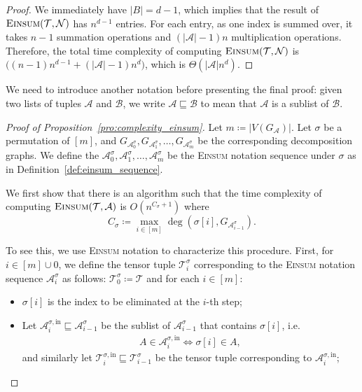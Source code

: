 \documentclass[12pt]{article}
\theoremstyle{plain}
\theoremstyle{definition}
\def\Einsum{\textsc{Einsum}}
\newcommand{\tensorcontraction}{\textsc{Einsum}}
\newcommand{\degp}[2]{\deg(#1,#2)}
\newcommand{\verticesp}[1]{V(#1)}
\newcommand{\graphform}[1]{G_{#1}}
\newcommand{\less}{O}
\newcommand{\appequal}{\Theta}
\def\calA{\mathcal{A}}
\def\calB{\mathcal{B}}
\def\calT{\mathcal{T}}
\def\calN{\mathcal{N}}
\begin{document}
\begin{bibunit}[agsm]
\begin{proof}
We immediately have $|B| = d - 1$, which implies that the result of $\tensorcontraction(\calT, \calN)$ has $n^{d-1}$ entries. For each entry, as one index is summed over, it takes $n-1$ summation operations and $(|\calA|-1)n$ multiplication operations. Therefore, the total time complexity of computing $\tensorcontraction(\calT, \calN)$ is $\big((n-1)n^{d-1} + (|\calA|-1)n^d\big)$, which is $\appequal(|\calA|n^{d})$. 
\end{proof}

We need to introduce another notation before presenting the final proof: given two lists of tuples $\calA$ and $\calB$, we write $\calA \sqsubseteq \calB$ to mean that $\calA$ is a sublist of $\calB$.

\begin{proof}[Proof of Proposition~\ref{pro:complexity_einsum}]    
Let $m \coloneqq |\verticesp{G_\calA}|$. Let $\sigma$ be a permutation of $[m]$, and $\graphform{\calA^{\sigma}_0}, \graphform{\calA^{\sigma}_1}, \ldots, \graphform{\calA^{\sigma}_m}$ be the corresponding decomposition graphs. We define the $\calA^{\sigma}_0, \calA^{\sigma}_1, \ldots, \calA^{\sigma}_m$ be the \Einsum{} notation sequence under $\sigma$ as in Definition~\ref{def:einsum_sequence}.
    
We first show that there is an algorithm such that the time complexity of computing $\tensorcontraction(\calT, \calA)$ is $\less(n^{C_\sigma + 1}) $ where
\begin{equation*}
C_\sigma \coloneqq \max_{i \in [m]} \degp{\sigma[i]}{\graphform{\calA^{\sigma}_{i-1}}}.
\end{equation*}

To see this, we use \Einsum{} notation to characterize this procedure. First, for $i \in [m] \cup {0}$, we define the tensor tuple $\calT^\sigma_i$ corresponding to the \Einsum{} notation sequence $\calA^\sigma_i$ as follows: $\calT^{\sigma}_{0} \coloneqq \calT$ and for each $i \in [m]$:
\begin{itemize}
    \item $\sigma[i]$ is the index to be eliminated at the $i$-th step;
    \item Let $\calA^{\sigma, \mathrm{in}}_i \sqsubseteq \calA^{\sigma}_{i-1}$ be the sublist of $\calA^{\sigma}_{i-1}$ that contains $\sigma[i]$, i.e.
    \begin{align*}
    A \in \calA^{\sigma, \mathrm{in}}_i \iff \sigma[i] \in A,
    \end{align*}
    and similarly let $\calT^{\sigma, \mathrm{in}}_i \sqsubseteq \calT^{\sigma}_{i-1}$ be the tensor tuple corresponding to $\calA^{\sigma, \mathrm{in}}_i $;
    

\end{itemize}
\end{proof}
\end{bibunit}
\end{document}
